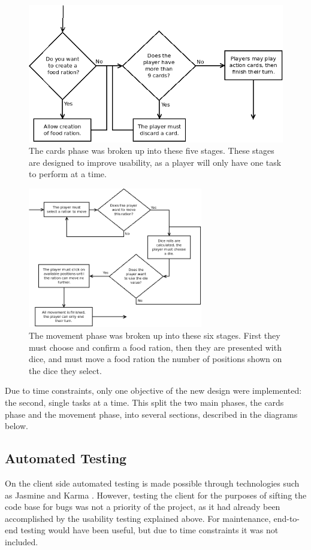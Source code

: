 \begin{figure}[h]
\centering
\includegraphics[width=6in]{Images/4/command-stages-cards}
\caption{The cards phase was broken up into these five stages. These stages are designed to improve usability, as a player will only have one task to perform at a time.}
\label{4_cards_commands}
\end{figure}

\begin{figure}[h]
\centering
\includegraphics[width=3in]{Images/4/command-stages-movement}
\caption{The movement phase was broken up into these six stages. First they must choose and confirm a food ration, then they are presented with dice, and must move a food ration the number of positions shown on the dice they select.}
\label{4_cards_commands}
\end{figure}

Due to time constraints, only one objective of the new design were implemented: the second, single tasks at a time. This split the two main phases, the cards phase and the movement phase, into several sections, described in the diagrams below.

\subsection{Automated Testing}
On the client side automated testing is made possible through technologies such as Jasmine and Karma \cite{KarmaJasmine}. However, testing the client for the purposes of sifting the code base for bugs was not a priority of the project, as it had already been accomplished by the usability testing explained above. For maintenance, end-to-end testing would have been useful, but due to time constraints it was not included.


